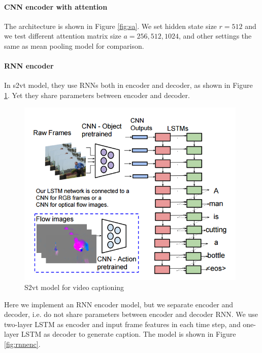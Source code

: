 \paragraph{CNN encoder with attention}
The architecture is shown in Figure \ref{fig:sa}. We set hidden state size $r=512$ and we test different attention matrix size $a=256,512,1024$, and other settings the same as mean pooling model for comparison.

\paragraph{RNN encoder}
In s2vt \cite{venugopalan2015sequence} model, they use RNNs both in encoder and decoder, as shown in Figure \ref{fig:s2vt}. Yet they share parameters between encoder and decoder.

\begin{figure}
\centering
\includegraphics[width=11cm]{resources/s2vt.png}
\caption{S2vt model for video captioning \cite{venugopalan2015sequence}}
\label{fig:s2vt}
\end{figure}

Here we implement an RNN encoder model, but we separate encoder and decoder, i.e. do not share parameters between encoder and decoder RNN. We use two-layer LSTM as encoder and input frame features in each time step, and one-layer LSTM as decoder to generate caption. The model is shown in Figure \ref{fig:rnnenc}.

